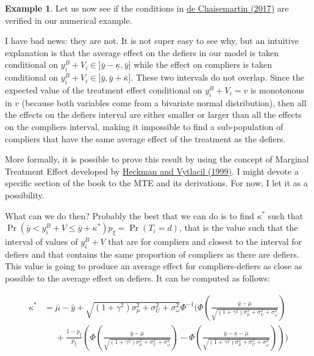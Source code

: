 \documentclass[
]{book}
\theoremstyle{definition}
\theoremstyle{definition}
\newtheorem{example}{Example}[chapter]
\theoremstyle{definition}
\theoremstyle{definition}
\theoremstyle{remark}
\begin{document}
\begin{example}
\protect\hypertarget{exm:unnamed-chunk-149}{}{\label{exm:unnamed-chunk-149} }Let us now see if the conditions in \href{https://drive.google.com/file/d/16XWlDECIvreM7l_NHe-JkXgyuPhFT1QG/view}{de Chaisemartin (2017)} are verified in our numerical example.
\end{example}
I have bad news: they are not.
It is not super easy to see why, but an intuitive explanation is that the average effect on the defiers in our model is taken conditional on \(y^B_i+V_i\in]\bar{y}-\underline{\kappa},\bar{y}]\) while the effect on compliers is taken conditional on \(y^B_i+V_i\in]\bar{y},\bar{y}+\bar{\kappa}]\).
These two intervals do not overlap.
Since the expected value of the treatment effect conditional on \(y^B_i+V_i=v\) is monotonous in \(v\) (because both variables come from a bivariate normal distribution), then all the effects on the defiers interval are either smaller or larger than all the effects on the compliers interval, making it impossible to find a sub-population of compliers that have the same average effect of the treatment as the defiers.

More formally, it is possible to prove this result by using the concept of Marginal Treatment Effect developed by \href{https://www.pnas.org/content/pnas/96/8/4730.full.pdf}{Heckman and Vytlacil (1999)}.
I might devote a specific section of the book to the MTE and its derivations.
For now, I let it as a possibility.

What can we do then?
Probably the best that we can do is to find \(\kappa^*\) such that \(\Pr(\bar{y}<y_i^B+V\leq\bar{y}+\kappa^*)p_{\xi}=\Pr(T_i=d)\), that is the value such that the interval of values of \(y_i^B+V\) that are for compliers and closest to the interval for defiers and that contains the same proportion of compliers as there are defiers.
This value is going to produce an average effect for compliers-defiers as close as possible to the average effect on defiers.
It can be computed as follows:

\begin{align*}
  \kappa^* & = \bar{\mu}-\bar{y}+\sqrt{(1+\gamma^2)\sigma^2_{\mu}+\sigma^2_U+\sigma^2_{\omega}}
                                  \Phi^{-1}\Bigg(\Phi\left(\frac{\bar{y}-\bar{\mu}}{\sqrt{(1+\gamma^2)\sigma^2_{\mu}+\sigma^2_U+\sigma^2_{\omega}}}\right)\\
           & \phantom{=}+\frac{1-p_{\xi}}{p_{\xi}}\left(\Phi\left(\frac{\bar{y}-\bar{\mu}}{\sqrt{(1+\gamma^2)\sigma^2_{\mu}+\sigma^2_U+\sigma^2_{\omega}}}\right)-\Phi\left(\frac{\bar{y}-\underline{\kappa}-\bar{\mu}}{\sqrt{(1+\gamma^2)\sigma^2_{\mu}+\sigma^2_U+\sigma^2_{\omega}}}\right)\right)\Bigg)
 \end{align*}
\end{document}
